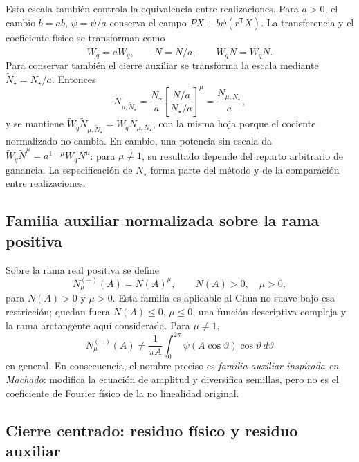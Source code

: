 Esta escala también controla la equivalencia entre realizaciones. Para
\(a>0\), el cambio
\(\widetilde b=ab\), \(\widetilde\psi=\psi/a\) conserva el campo
\(PX+b\psi(r^{\mathsf T}X)\). La transferencia y el coeficiente físico
se transforman como
\[
 \widetilde W_q=aW_q,\qquad \widetilde N=N/a,
 \qquad \widetilde W_q\widetilde N=W_qN.
\]
Para conservar también el cierre auxiliar se transforma la escala mediante
\(\widetilde N_\star=N_\star/a\). Entonces
\begin{equation}
 \widetilde N_{\mu,\widetilde N_\star}
 =\frac{N_\star}{a}
 \left[\frac{N/a}{N_\star/a}\right]^\mu
 =\frac{N_{\mu,N_\star}}{a},
 \label{eq:machado-scale-covariance}
\end{equation}
y se mantiene
\(\widetilde W_q\widetilde N_{\mu,\widetilde N_\star}
=W_qN_{\mu,N_\star}\), con la misma hoja porque el cociente
normalizado no cambia. En cambio, una potencia sin escala da
\(\widetilde W_q\widetilde N^\mu=a^{1-\mu}W_qN^\mu\): para
\(\mu\ne1\), su resultado depende del reparto arbitrario de ganancia.
La especificación de \(N_\star\) forma parte del método y de la
comparación entre realizaciones.

\subsection{Familia auxiliar normalizada sobre la rama positiva}

Sobre la rama real positiva se define
\begin{equation}
 N_\mu^{(+)}(A)=N(A)^\mu,
 \qquad N(A)>0,\quad \mu>0,
 \label{eq:hafo-machado}
\end{equation}
para \(N(A)>0\) y \(\mu>0\). Esta familia es aplicable al Chua no suave bajo
esa restricción; quedan fuera \(N(A)\leq0\), \(\mu\leq0\), una función
descriptiva compleja y la rama arctangente aquí considerada. Para
\(\mu\neq1\),
\begin{equation}
 N_\mu^{(+)}(A)
 \neq\frac{1}{\pi A}\int_0^{2\pi}
 \psi(A\cos\vartheta)\cos\vartheta\,d\vartheta
 \label{eq:machado-not-physical-fourier}
\end{equation}
en general. En consecuencia, el nombre preciso es
\emph{familia auxiliar inspirada en Machado}: modifica la ecuación de
amplitud y diversifica semillas, pero no es el coeficiente de Fourier físico
de la no linealidad original.

\subsection{Cierre centrado: residuo físico y residuo auxiliar}

